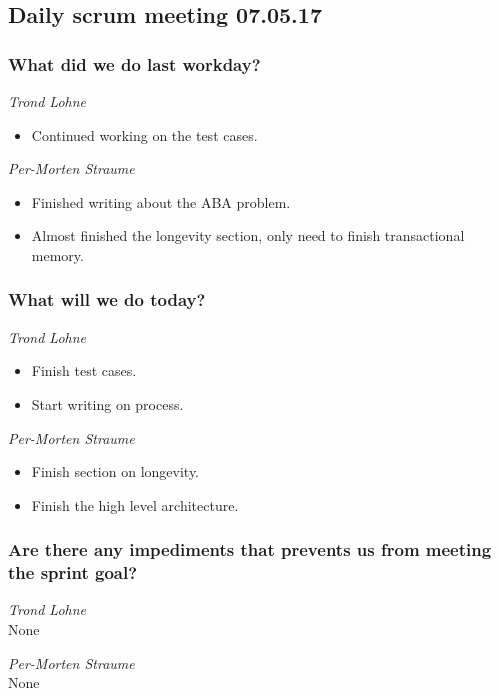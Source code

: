 \documentclass{article}
\begin{document}
\begin{center}
\subsection*{Daily scrum meeting 07.05.17}
\end{center}
\bigskip


\subsubsection*{What did we do last workday?}

\noindent\textit{Trond Lohne}
\begin{itemize}
	\item
	Continued working on the test cases.
\end{itemize}

\medskip

\noindent\textit{Per-Morten Straume}
\begin{itemize}
	\item
	Finished writing about the ABA problem.

	\item
	Almost finished the longevity section,
    only need to finish transactional memory.
\end{itemize}


\subsubsection*{What will we do today?}

\noindent\textit{Trond Lohne}
\begin{itemize}
	\item
	Finish test cases.

	\item
	Start writing on process.
\end{itemize}

\medskip

\noindent\textit{Per-Morten Straume}
\begin{itemize}
	\item
	Finish section on longevity.

	\item
	Finish the high level architecture.
\end{itemize}


\subsubsection*{Are there any impediments that prevents us from meeting the sprint goal?}

\noindent\textit{Trond Lohne}\\
None

\medskip

\noindent\textit{Per-Morten Straume}\\
None
\end{document}
